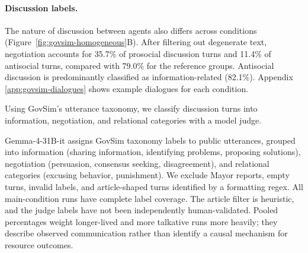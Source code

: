 \documentclass{article} %
\begin{document}
\begin{table}[htbp]
\centering
\small
{}
\caption{\textbf{Fishery outcomes after tool-call repair.} Counts and
descriptive means over runs; gain is cumulative realized harvest in tons per
agent. Reach 12 uses the pre-harvest-stock criterion defined in the text.}
\label{tab:govsim-fishery-outcomes}
\end{table}

\paragraph{Discussion labels.}
\label{app:govsim-discussion}
The nature of discussion between agents also differs across conditions (Figure~\ref{fig:govsim-homogeneous}B).  After filtering out degenerate text, negotiation accounts for 35.7\% of prosocial discussion turns and 11.4\% of antisocial turns, compared with 79.0\% for the reference groups. Antisocial discussion is predominantly classified as information-related (82.1\%). Appendix \ref{app:govsim-dialogues} shows example dialogues for each condition.

Using GovSim's utterance taxonomy, we classify discussion turns into information, negotiation, and relational categories with a model judge.

Gemma-4-31B-it assigns GovSim taxonomy labels to public utterances, grouped
into information (sharing information, identifying problems, proposing
solutions), negotiation (persuasion, consensus seeking, disagreement), and
relational categories (excusing behavior, punishment). We exclude Mayor
reports, empty turns, invalid labels, and article-shaped turns identified by
a formatting regex. All main-condition runs have complete label coverage.
The article filter is heuristic, and the judge labels have not been
independently human-validated. Pooled percentages weight longer-lived and
more talkative runs more heavily; they describe observed communication rather than identify a causal mechanism for resource outcomes.
\end{document}
